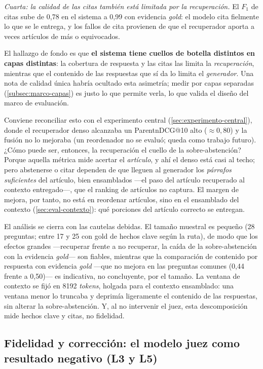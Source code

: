 \emph{Cuarta: la calidad de las citas también está limitada por la recuperación.} El $F_1$ de citas sube de 0,78 en el sistema a 0,99 con evidencia \emph{gold}: el modelo cita fielmente lo que se le entrega, y los fallos de cita provienen de que el recuperador aporta a veces artículos de más o equivocados.

El hallazgo de fondo es que \textbf{el sistema tiene cuellos de botella distintos en capas distintas}: la cobertura de respuesta y las citas las limita la \emph{recuperación}, mientras que el contenido de las respuestas que sí da lo limita el \emph{generador}. Una nota de calidad única habría ocultado esta asimetría; medir por capas separadas (\ref{subsec:marco-capas}) es justo lo que permite verla, lo que valida el diseño del marco de evaluación.

Conviene reconciliar esto con el experimento central (\ref{sec:experimento-central}), donde el recuperador denso alcanzaba un ParentnDCG@10 alto (${\approx}0{,}80$) y la fusión no lo mejoraba (un reordenador no se evaluó; queda como trabajo futuro). ¿Cómo puede ser, entonces, la recuperación el cuello de la sobre-abstención? Porque aquella métrica mide acertar el \emph{artículo}, y ahí el denso está casi al techo; pero abstenerse o citar dependen de que lleguen al generador los \emph{párrafos suficientes} del artículo, bien ensamblados —el paso del artículo recuperado al contexto entregado—, que el ranking de artículos no captura. El margen de mejora, por tanto, no está en reordenar artículos, sino en el ensamblado del contexto (\ref{sec:eval-contexto}): qué porciones del artículo correcto se entregan.

El análisis se cierra con las cautelas debidas. El tamaño muestral es pequeño (28 preguntas; entre 17 y 25 con gold de hechos clave según la ruta), de modo que los efectos grandes —recuperar frente a no recuperar, la caída de la sobre-abstención con la evidencia \emph{gold}— son fiables, mientras que la comparación de contenido por respuesta con evidencia \emph{gold} —que no mejora en las preguntas comunes (0,44 frente a 0,50)— es indicativa, no concluyente, por el tamaño. La ventana de contexto se fijó en 8192 \emph{tokens}, holgada para el contexto ensamblado: una ventana menor lo truncaba y deprimía ligeramente el contenido de las respuestas, sin alterar la sobre-abstención. Y, al no intervenir el juez, esta descomposición mide hechos clave y citas, no fidelidad.

\subsection{Fidelidad y corrección: el modelo juez como resultado negativo (L3 y L5)}
\label{subsec:gen-juez}

